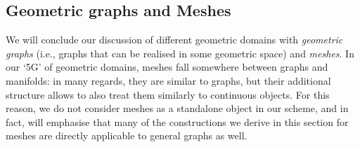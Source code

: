 





\subsection{Geometric graphs and Meshes}
\label{sec:meshes}

We will conclude our discussion of different geometric domains with {\em geometric graphs} (i.e., graphs that can be realised in some geometric space) and {\em meshes}. 
%
%
In our `5G' of geometric domains, meshes fall somewhere between graphs and manifolds: in many regards, they are similar to graphs, but their additional structure allows to also treat them similarly to continuous objects. 
%
For this reason, we do not consider meshes as a standalone object in our scheme, and in fact, will emphasise that many of the constructions we derive in this section for meshes are directly applicable to general graphs as well.   
%




